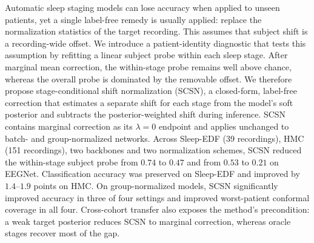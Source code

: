 Automatic sleep staging models can lose accuracy when applied to unseen
patients, yet a single label-free remedy is usually applied: replace the
normalization statistics of the target recording. This assumes that subject
shift is a recording-wide offset. We introduce a patient-identity diagnostic
that tests this assumption by refitting a linear subject probe within each
sleep stage. After marginal mean correction, the within-stage probe remains
well above chance, whereas the overall probe is dominated by the removable
offset. We therefore propose stage-conditional shift normalization (SCSN), a
closed-form, label-free correction that estimates a separate shift for each
stage from the model's soft posterior and subtracts the posterior-weighted
shift during inference. SCSN contains marginal correction as its $\lambda=0$
endpoint and applies unchanged to batch- and group-normalized networks.
Across Sleep-EDF (39 recordings), HMC (151 recordings), two backbones and two
normalization schemes, SCSN reduced the within-stage subject probe from
$0.74$ to $0.47$ and from $0.53$ to $0.21$ on EEGNet. Classification accuracy
was preserved on Sleep-EDF and improved by $1.4$--$1.9$ points on HMC. On
group-normalized models, SCSN significantly improved accuracy in three of four
settings and improved worst-patient conformal coverage in all four. Cross-cohort
transfer also exposes the method's precondition: a weak target posterior
reduces SCSN to marginal correction, whereas oracle stages recover most of the
gap.
